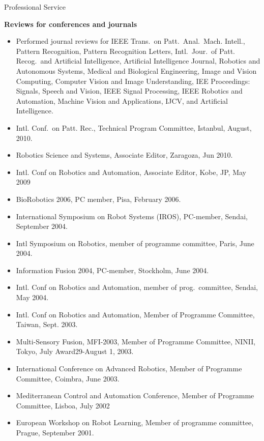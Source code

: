 \documentclass{article}
\begin{document}
\begin{cv}
\begin{cvlist}{Professional Service}
\item {\bf Reviews for conferences and journals}
  \begin{itemize}
    \item Performed journal reviews for IEEE Trans.\ on Patt.\ Anal.\ Mach. Intell.,
          Pattern Recognition, Pattern Recognition Letters, Intl.\ Jour.\ of Patt.\@
          Recog.\ and Artificial Intelligence, Artificial Intelligence Journal,
          Robotics and Autonomous Systems, Medical and Biological Engineering,
          Image and Vision Computing, Computer Vision and Image Understanding,
          IEE Proceedings: Signals, Speech and Vision, IEEE Signal Processing,
          IEEE Robotics and Automation, Machine Vision and Applications, IJCV,
          and Artificial Intelligence.
    \item Intl. Conf.\ on Patt. Rec., Technical Program Committee, Istanbul,
          August, 2010.
    \item Robotics Science and Systems, Associate Editor, Zaragoza, Jun 2010.
    \item Intl. Conf on Robotics and Automation, Associate Editor, Kobe, JP, May
          2009
    \item BioRobotics 2006, PC member, Pisa, February 2006.
    \item International Symposium on Robot Systems (IROS), PC-member, Sendai,
          September 2004.
    \item Intl Symposium on Robotics, member of programme committee, Paris, June
          2004.
    \item Information Fusion 2004, PC-member, Stockholm, June 2004.
    \item Intl. Conf on Robotics and Automation, member of prog.\ committee, Sendai,
          May 2004.
    \item Intl. Conf on Robotics and Automation, Member of Programme Committee,
          Taiwan, Sept. 2003.
    \item Multi-Sensory Fusion, MFI-2003, Member of Programme Committee, NINII,
          Tokyo, July Award29-August 1, 2003.
    \item International Conference on Advanced Robotics, Member of Programme
          Committee, Coimbra, June 2003.
    \item Mediterranean Control and Automation Conference, Member of Programme
          Committee, Lisboa, July 2002
    \item European Workshop on Robot Learning, Member of programme committee,
          Prague, September 2001.

\end{itemize}
\end{cvlist}
\end{cv}
\end{document}
